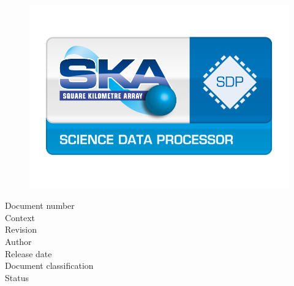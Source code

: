 \thispagestyle{empty}


\setlength{\unitlength}{1mm}


\phantom{test}
\begin{figure}[h]
  \centering
  \includegraphics[width=\textwidth]{science_data_processor_logo.jpg}
\end{figure}


\begin{center}
\fontsize{22}{24}\selectfont \sffamily\bigdoctitle
\end{center}

\vspace{1cm}

\noindent\normalsize{Document number \dotfill \docnr}\\
\normalsize{Context \dotfill \context}\\
\normalsize{Revision \dotfill \revision}\\
\normalsize{Author \dotfill \docauthor}\\
\normalsize{Release date \dotfill \docudate}\\
\normalsize{Document classification \dotfill \classification}\\
\normalsize{Status \dotfill \docstatus}





\newpage

\begin{center}
\signaturetable{\firstsigname}{\firstsigdesignation}{\firstsigaffiliation}
\end{center}


\begin{center}
\signaturetable{\secondsigname}{\secondsigdesignation}{\secondsigaffiliation}
\end{center}

\vspace{0.5cm}

\begin{center}
\versiontable
\end{center}

\vspace{0.5cm}

\begin{center}
\organisationtable
\end{center}

